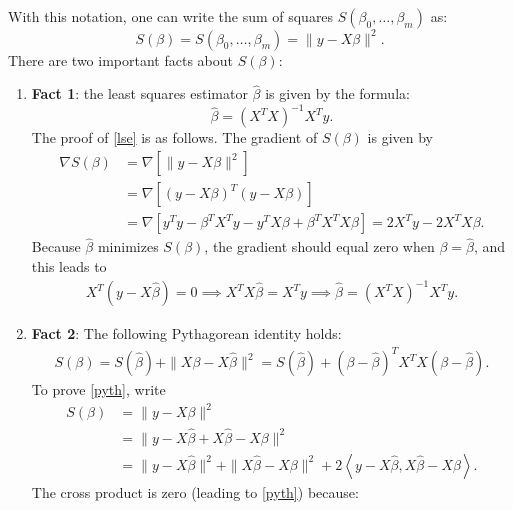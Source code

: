\documentclass{scrartcl}
\begin{document}
With this notation, one can write the sum of squares $S(\beta_0,
\dots, \beta_m)$ as: 
\begin{equation*}
  S(\beta) = S(\beta_0, \dots, \beta_m) = \|y - X \beta\|^2. 
\end{equation*}
There are two important facts about $S(\beta)$:
\begin{enumerate}
\item \textbf{Fact 1}: the least squares estimator $\hat{\beta}$
  is given by the formula:
  \begin{equation}\label{lse}
    \hat{\beta} = (X^T X)^{-1} X^T y. 
  \end{equation}
  The proof of \eqref{lse} is as follows. The gradient of $S(\beta)$
  is given by
  \begin{align*}
    \nabla S(\beta) &= \nabla \left[ \|y - X \beta\|^2 \right] \\
                    &= \nabla \left[ (y - X\beta)^T (y - X \beta) \right] \\
                    &= \nabla \left[ y^T y - \beta^T X^T y - y^T X
                      \beta + \beta^T X^T X \beta\right] = 2 X^T y -
                                                           2 X^T X
                                                           \beta.  
  \end{align*}
  Because $\hat{\beta}$ minimizes $S(\beta)$, the gradient should
  equal zero when $\beta = \hat{\beta}$, and this leads to
  \begin{align}\label{normeq}
    X^T (y - X \hat{\beta}) = 0 \implies X^T X \hat{\beta} = X^T y
    \implies \hat{\beta} = (X^T X)^{-1} X^T y. 
  \end{align}
\item \textbf{Fact 2}: The following Pythagorean identity holds:
  \begin{align}
    \label{pyth}
    S(\beta) = S(\hat{\beta}) + \|X \beta - X \hat{\beta}\|^2 =
    S(\hat{\beta}) + (\beta - \hat{\beta})^T X^T X (\beta - 
    \hat{\beta}). 
  \end{align}
  To prove \eqref{pyth}, write
  \begin{align*}
    S(\beta) &= \|y - X \beta\|^2 \\
             &= \|y - X\hat{\beta} + X \hat{\beta} - X \beta\|^2 \\
    &= \|y - X \hat{\beta}\|^2 + \|X \hat{\beta} - X \beta\|^2 + 2
      \left<y - X \hat{\beta}, X \hat{\beta} - X \beta \right>. 
  \end{align*}
  The cross product is zero (leading to \eqref{pyth}) because:

\end{enumerate}
\end{document}
